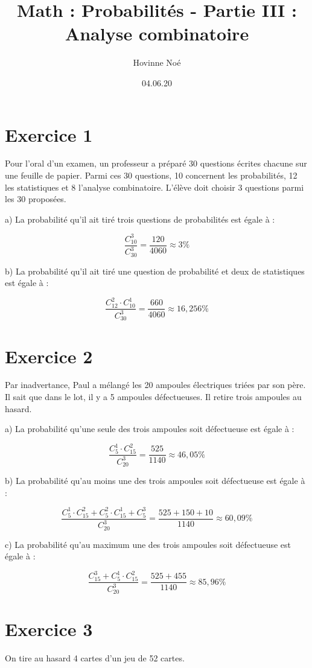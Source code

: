 \documentclass[10pt]{article}
\begin{document}
\title{Math : Probabilités - Partie III : Analyse combinatoire}
\author{Hovinne Noé}
\date{04.06.20}
\maketitle
\section*{Exercice 1}
Pour l'oral d'un examen, un professeur a préparé 30 questions écrites chacune sur une feuille de papier. Parmi ces 30 questions, 10 concernent les probabilités, 12 les statistiques et 8 l'analyse combinatoire. L'élève doit choisir 3 questions parmi les 30 proposées.\vspace{0,2cm}

a) La probabilité qu'il ait tiré trois questions de probabilités est égale à :

$$\frac{C_{10}^3}{C_{30}^3}=\frac{120}{4060}\approx 3\%$$

b) La probabilité qu'il ait tiré une question de probabilité et deux de statistiques est égale à :

$$\frac{C_{12}^2\cdot C_{10}^1}{C_{30}^3}=\frac{660}{4060}\approx16,256\%$$

\section*{Exercice 2}
Par inadvertance, Paul a mélangé les 20 ampoules électriques triées par son père. Il sait que dans le lot, il y a 5 ampoules défectueuses. Il retire trois ampoules au hasard.\vspace{0,2cm}

a) La probabilité qu'une seule des trois ampoules soit défectueuse est égale à :

$$\frac{C_5^1\cdot C_{15}^2}{C_{20}^3}=\frac{525}{1140}\approx46,05\%$$

b) La probabilité qu'au moins une des trois ampoules soit défectueuse est égale à :

$$\frac{C_5^1\cdot C_{15}^2+C_5^2\cdot C_{15}^1+C_5^3}{C_{20}^3}=\frac{525+150+10}{1140}\approx60,09\%$$

c) La probabilité qu'au maximum une des trois ampoules soit défectueuse est égale à :

$$\frac{C_{15}^3+C_5^1\cdot C_{15}^2}{C_{20}^3}=\frac{525+455}{1140}\approx85,96\%$$

\section*{Exercice 3}
On tire au hasard 4 cartes d'un jeu de 52 cartes.\vspace{0,2cm}
\end{document}
